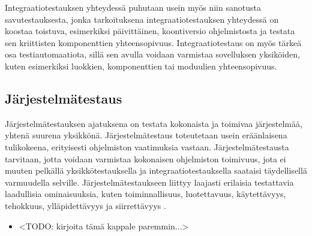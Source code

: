     Integraatiotestauksen yhteydessä puhutaan usein myös niin sanotusta savutestauksesta, jonka tarkoituksena integraatiotestauksen yhteydessä on koostaa toistuva, esimerkiksi päivittäinen, koontiversio ohjelmistosta ja testata sen kriittisten komponenttien yhteensopivuus.
    Integraatiotestaus on myös tärkeä osa testiautomaatiota, sillä sen avulla voidaan varmistaa sovelluksen yksiköiden, kuten esimerkiksi luokkien, komponenttien tai moduulien yhteensopivuus.

  \subsection{Järjestelmätestaus} \label{ch:07_jarjestelmatestaus}

    Järjestelmätestauksen ajatuksena on testata kokonaista ja toimivaa järjestelmää, yhtenä suurena yksikkönä.
    Järjestelmätestaus toteutetaan usein eräänlaisena tulikokeena, erityisesti ohjelmiston vaatimuksia vastaan.
    Järjestelmätestausta tarvitaan, jotta voidaan varmistaa kokonaisen ohjelmiston toimivuus, jota ei muuten pelkällä yksikkötestauksella ja integraatiotestauksella saataisi täydellisellä varmuudella selville.
    Järjestelmätestaukseen liittyy laajasti erilaisia testattavia laadullisia ominaisuuksia, kuten toiminnallisuus, luotettavuus, käytettävyys, tehokkuus, ylläpidettävyys ja siirrettävyys \parencite{iso_9126-1_2001}.



    \begin{itemize}
      \item <TODO: kirjoita tämä kappale paremmin...>
    \end{itemize}

